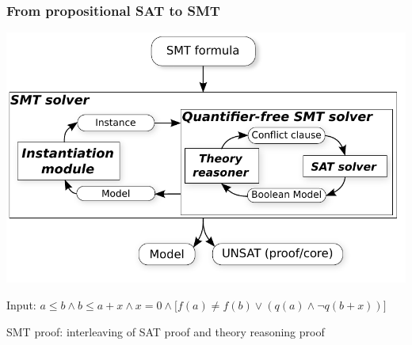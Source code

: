 \documentclass[svgnames,table,mathserif]{beamer}
\begin{document}
\begin{frame}
  \frametitle{From propositional SAT to SMT}

  \begin{center}
    \includegraphics[height=0.5\textheight]{SMT9.pdf}
  \end{center}

\vspace*{-14pt}
\begin{footnotesize}
  Input: $a \leq b \wedge b \leq a + x \wedge x = 0 \wedge
  \big[ f(a) \neq f(b) \vee (q(a) \wedge \neg q(b + x)) \big]$

  \vspace*{2pt}

  \vspace*{2pt}

  \vspace*{2pt}
\end{footnotesize}

\begin{block}{}
  SMT proof: interleaving of SAT proof and theory reasoning proof
\end{block}

\end{frame}

\end{document}
